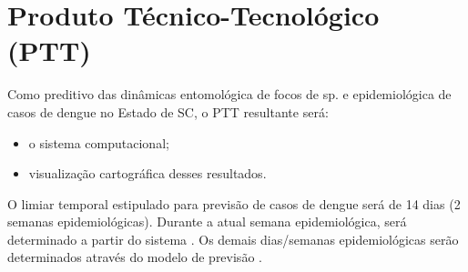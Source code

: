 


\section{Produto Técnico-Tecnológico (PTT)} 

\indent Como preditivo das dinâmicas entomológica de focos de  sp. e epidemiológica de casos de dengue no Estado de \acrlong{SC}, o \acrshort{PTT} resultante será:

\begin{itemize}
  \item o sistema computacional;
  \item visualização cartográfica desses resultados.
\end{itemize}


\indent O limiar temporal estipulado para previsão de casos de dengue será de 14 dias (2 semanas epidemiológicas). Durante a atual semana epidemiológica, será determinado a partir do sistema . Os demais dias/semanas epidemiológicas serão determinados através do modelo de previsão .









